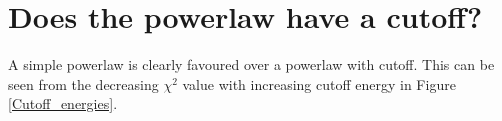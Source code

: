 \documentclass[a4paper]{article}
\begin{document}
\newpage
\section{Does the powerlaw have a cutoff?}
A simple powerlaw is clearly favoured over a powerlaw with cutoff. This can be seen from the decreasing $\chi^2$ value with increasing cutoff energy in Figure \ref{Cutoff_energies}. 
\begin{figure}[h]
\end{figure}
\end{document}
